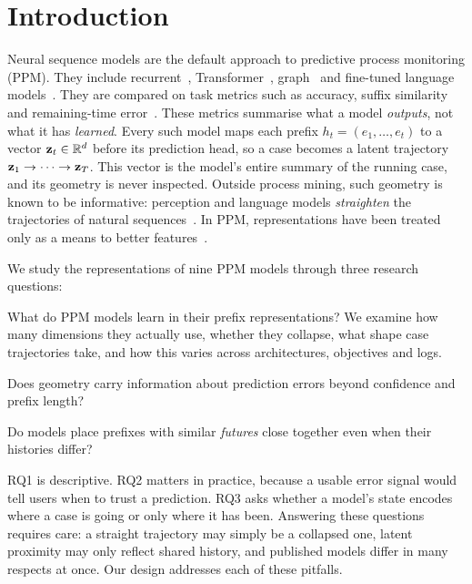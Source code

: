 \section{Introduction}\label{sec:intro}

Neural sequence models are the default approach to predictive process
monitoring (PPM). They include recurrent~\cite{tax2017lstm,evermann2017deep,camargo2019lstm},
Transformer~\cite{bukhsh2021processtransformer,wuyts2024sutran},
graph~\cite{dissegna2025gnn,wang2025rlhgnn} and fine-tuned language
models~\cite{pasquadibisceglie2024lupin}. They are compared on task metrics
such as accuracy, suffix similarity and remaining-time
error~\cite{rama2022review,teinemaa2019outcome}. These metrics summarise what
a model \emph{outputs}, not what it has \emph{learned}. Every such model maps
each prefix $h_t=(e_1,\dots,e_t)$ to a vector $\mathbf{z}_t\in\mathbb{R}^d$ before its
prediction head, so a case becomes a latent trajectory $\mathbf{z}_1\to\cdots\to\mathbf{z}_T$.
This vector is the model's entire summary of the running case, and its
geometry is never inspected. Outside process mining, such geometry is known to
be informative: perception and language models \emph{straighten} the
trajectories of natural sequences~\cite{henaff2019straightening,hosseini2023straighten}.
In PPM, representations have been treated only as a means to better
features~\cite{dekoninck2018act2vec}.

We study the representations of nine PPM models through three research
questions:
\begin{description}[leftmargin=1.2em,labelsep=0.4em,itemsep=0pt,topsep=2pt,font=\normalfont\bfseries]
  \item[RQ1] What do PPM models learn in their prefix representations? We
        examine how many dimensions they actually use, whether they collapse,
        what shape case trajectories take, and how this varies across
        architectures, objectives and logs.
  \item[RQ2] Does geometry carry information about prediction errors beyond
        confidence and prefix length?
  \item[RQ3] Do models place prefixes with similar \emph{futures} close together
        even when their histories differ?
\end{description}
RQ1 is descriptive. RQ2 matters in practice, because a usable error signal
would tell users when to trust a prediction. RQ3 asks whether a model's state
encodes where a case is going or only where it has been. Answering these
questions requires care: a straight trajectory may simply be a collapsed one,
latent proximity may only reflect shared history, and published models differ
in many respects at once. Our design addresses each of these pitfalls.

